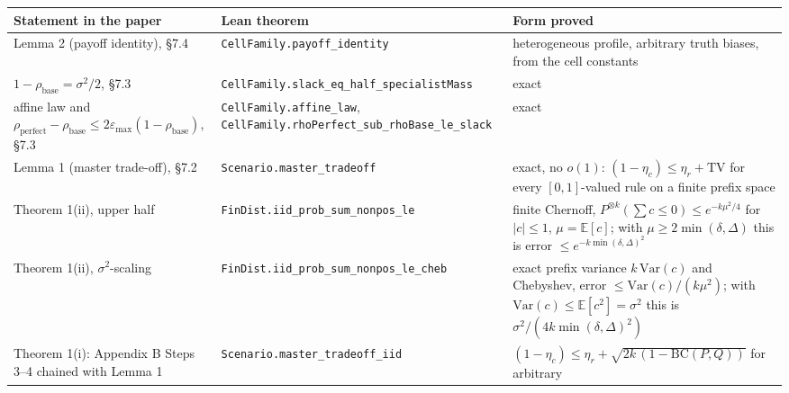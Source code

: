 { %
\begin{longtable}[]{@{}
  >{\raggedright\arraybackslash}p{}
  >{\raggedright\arraybackslash}p{}
  >{\raggedright\arraybackslash}p{}@{}}
\toprule\noalign{}
\begin{minipage}[b]{\linewidth}\raggedright
Statement in the paper
\end{minipage} & \begin{minipage}[b]{\linewidth}\raggedright
Lean theorem
\end{minipage} & \begin{minipage}[b]{\linewidth}\raggedright
Form proved
\end{minipage} \\
\midrule\noalign{}
\endhead
\bottomrule\noalign{}
\endlastfoot
Lemma 2 (payoff identity), §7.4 & \texttt{CellFamily.payoff\_identity} &
heterogeneous profile, arbitrary truth biases, from the cell
constants \\
\(1-\rho_{\mathrm{base}}=\sigma^2/2\), §7.3 &
\texttt{CellFamily.}\allowbreak\texttt{slack\_eq\_half\_specialistMass}
& exact \\
affine law and
\(\rho_{\mathrm{perfect}}-\rho_{\mathrm{base}}\le 2\varepsilon_{\max}(1-\rho_{\mathrm{base}})\),
§7.3 & \texttt{CellFamily.affine\_law},
\texttt{CellFamily.}\allowbreak\texttt{rhoPerfect\_sub\_rhoBase\_le\_slack}
& exact \\
Lemma 1 (master trade-off), §7.2 & \texttt{Scenario.master\_tradeoff} &
exact, no \(o(1)\): \((1-\eta_c)\le\eta_r+\mathrm{TV}\) for every
\([0,1]\)-valued rule on a finite prefix space \\
Theorem 1(ii), upper half &
\texttt{FinDist.}\allowbreak\texttt{iid\_prob\_sum\_nonpos\_le} & finite
Chernoff, \(P^{\otimes k}(\sum c\le0)\le e^{-k\mu^2/4}\) for
\(\lvert c\rvert\le1\), \(\mu=\mathbb E[c]\); with
\(\mu\ge2\min(\delta,\Delta)\) this is error
\(\le e^{-k\min(\delta,\Delta)^2}\) \\
Theorem 1(ii), \(\sigma^2\)-scaling &
\texttt{FinDist.}\allowbreak\texttt{iid\_prob\_sum\_nonpos\_le\_cheb} &
exact prefix variance \(k\,\mathrm{Var}(c)\) and Chebyshev, error
\(\le\mathrm{Var}(c)/(k\mu^2)\); with
\(\mathrm{Var}(c)\le\mathbb E[c^2]=\sigma^2\) this is
\(\sigma^2/(4k\min(\delta,\Delta)^2)\) \\
Theorem 1(i): Appendix B Steps 3--4 chained with Lemma 1 &
\texttt{Scenario.}\allowbreak\texttt{master\_tradeoff\_iid} &
\((1-\eta_c)\le\eta_r+\sqrt{2k\,(1-\mathrm{BC}(P,Q))}\) for arbitrary

\end{longtable}}
